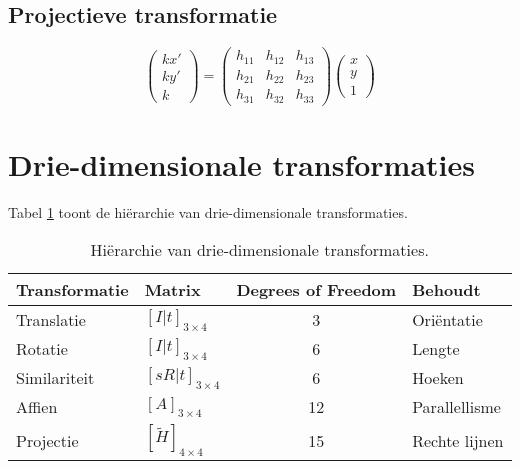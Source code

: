 \subsection{Projectieve transformatie}

$$\begin{pmatrix}
kx' \\ ky' \\ k
\end{pmatrix}
=
\begin{pmatrix}
h_{11} & h_{12} & h_{13} \\
h_{21} & h_{22} & h_{23} \\
h_{31} & h_{32} & h_{33}
\end{pmatrix}
\begin{pmatrix}
x \\ y \\ 1
\end{pmatrix}$$

\section{Drie-dimensionale transformaties}
Tabel \ref{table:DrieDimensionaleTransformaties} toont de hiërarchie van drie-dimensionale transformaties.
\begin{table}
	\centering
	\begin{tabular}{l l c l }
		Transformatie & Matrix & Degrees of Freedom & Behoudt \\
		\hline
		Translatie & $[ I | t]_{3 \times 4}$ & 3 & Oriëntatie \\
		Rotatie & $[ I | t]_{3 \times 4}$ & 6 & Lengte \\
		Similariteit & $[ sR | t]_{3 \times 4}$ & 6 & Hoeken \\
		Affien & $[ A ]_{3 \times 4}$ & 12 & Parallellisme \\
		Projectie & $[ \widetilde{H} ]_{4 \times 4}$ & 15 & Rechte lijnen \\
	\end{tabular}
	\caption{Hiërarchie van drie-dimensionale transformaties.}
	\label{table:DrieDimensionaleTransformaties}
\end{table}
